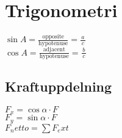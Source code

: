 \section{Trigonometri}
\begin{math}
	\sin A=\frac{\textrm{opposite}}{\textrm{hypotenuse}}=\frac{a}{\,c\,}
\end{math} \\[2pt]
\begin{math}
	\cos A=\frac{\textrm{adjacent}}{\textrm{hypotenuse}}=\frac{b}{\,c\,}
\end{math} \\[2pt]

\subsection{Kraftuppdelning}
\begin{math}
    F_x = \cos \alpha \cdot F
\end{math} \\[2pt]
\begin{math}
    F_y = \sin \alpha \cdot F
\end{math} \\[2pt]
\begin{math}
    F_netto = \sum F_ext
\end{math} \\[2pt]


